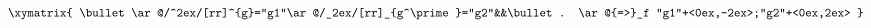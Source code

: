 \begin{equation}
\label{eq_bigon}
\begin{aligned}
\xymatrix{
  \bullet\ar@/^2ex/[rr]^{g}="g1"\ar@/_2ex/[rr]_{g^\prime}="g2"&&\bullet.
  \ar@{=>}_f "g1"+<0ex,-2ex>;"g2"+<0ex,2ex>
}
\end{aligned}
\end{equation}

